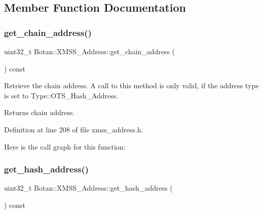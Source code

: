\subsection{Member Function Documentation}
\mbox{\label{class_botan_1_1_x_m_s_s___address_adbab35e6d0dc8a0ff3e5c95ffa73cbee}} 
\subsubsection{\texorpdfstring{get\+\_\+chain\+\_\+address()}{get\_chain\_address()}}
{\footnotesize\ttfamily uint32\+\_\+t Botan\+::\+X\+M\+S\+S\+\_\+\+Address\+::get\+\_\+chain\+\_\+address (\begin{DoxyParamCaption}{ }\end{DoxyParamCaption}) const\hspace{0.3cm}{\ttfamily [inline]}}

Retrieve the chain address. A call to this method is only valid, if the address type is set to Type\+::\+O\+T\+S\+\_\+\+Hash\+\_\+\+Address.

\begin{DoxyReturn}{Returns}
chain address. 
\end{DoxyReturn}


Definition at line 208 of file xmss\+\_\+address.\+h.

Here is the call graph for this function\+:
\mbox{\label{class_botan_1_1_x_m_s_s___address_af6ac58ed613b3b523628ccfcde73f7c2}} 
\subsubsection{\texorpdfstring{get\+\_\+hash\+\_\+address()}{get\_hash\_address()}}
{\footnotesize\ttfamily uint32\+\_\+t Botan\+::\+X\+M\+S\+S\+\_\+\+Address\+::get\+\_\+hash\+\_\+address (\begin{DoxyParamCaption}{ }\end{DoxyParamCaption}) const\hspace{0.3cm}{\ttfamily [inline]}}

